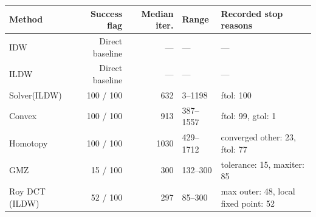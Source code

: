 \begin{tabular}{lrrlp{5.0cm}}\toprule
Method & Success flag & Median iter. & Range & Recorded stop reasons \\ \midrule
IDW & Direct baseline & --- & --- & --- \\
ILDW & Direct baseline & --- & --- & --- \\
Solver(ILDW) & 100 / 100 & 632 & 3--1198 & ftol: 100 \\
Convex & 100 / 100 & 913 & 387--1557 & ftol: 99, gtol: 1 \\
Homotopy & 100 / 100 & 1030 & 429--1712 & converged other: 23, ftol: 77 \\
GMZ & 15 / 100 & 300 & 132--300 & tolerance: 15, maxiter: 85 \\
Roy DCT (ILDW) & 52 / 100 & 297 & 85--300 & max outer: 48, local fixed point: 52 \\
\bottomrule\end{tabular}
